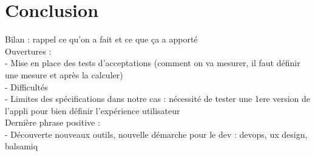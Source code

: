 	\section*{Conclusion}
		Bilan : rappel ce qu'on a fait et ce que ça a apporté\\
		Ouvertures :\\
			- Mise en place des tests d'acceptations (comment on va mesurer, il faut définir une mesure et après la calculer)\\
			- Difficultés\\
			- Limites des spécifications dans notre cas : nécessité de tester une 1ere version de l'appli pour bien définir l'expérience utilisateur\\
		Dernière phrase positive :\\
			- Découverte nouveaux outils, nouvelle démarche pour le dev : devops, ux design, balsamiq
		

